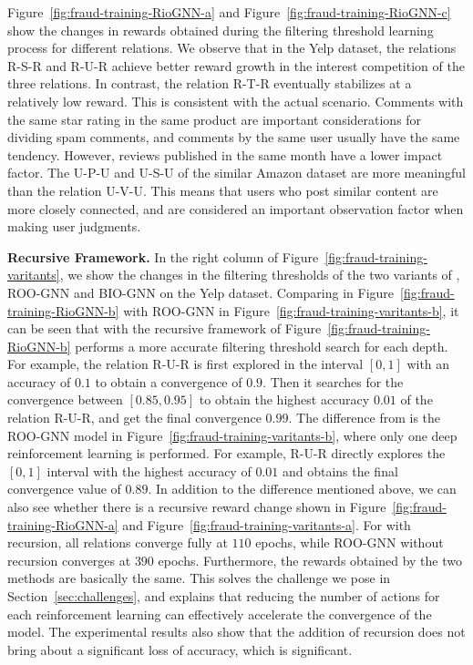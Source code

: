 Figure~\ref{fig:fraud-training-RioGNN-a} and Figure~\ref{fig:fraud-training-RioGNN-c} show the changes in rewards obtained during the filtering threshold learning process for different relations.
We observe that in the Yelp dataset, the relations R-S-R and R-U-R achieve better reward growth in the interest competition of the three relations. 
In contrast, the relation R-T-R eventually stabilizes at a relatively low reward. 
This is consistent with the actual scenario. 
Comments with the same star rating in the same product are important considerations for dividing spam comments, and comments by the same user usually have the same tendency. 
However, reviews published in the same month have a lower impact factor. 
The U-P-U and U-S-U of the similar Amazon dataset are more meaningful than the relation U-V-U. 
This means that users who post similar content are more closely connected, and are considered an important observation factor when making user judgments.



\textbf{Recursive Framework.}
In the right column of Figure~\ref{fig:fraud-training-varitants}, we show the changes in the filtering thresholds of the two variants of \RSRL, ROO-GNN and BIO-GNN on the Yelp dataset.
Comparing \RioGNN in Figure~\ref{fig:fraud-training-RioGNN-b} with ROO-GNN in Figure~\ref{fig:fraud-training-varitants-b}, it can be seen that \RioGNN with the recursive framework of Figure~\ref{fig:fraud-training-RioGNN-b} performs a more accurate filtering threshold search for each depth.
For example, the relation R-U-R is first explored in the interval $[0,1]$ with an accuracy of $0.1$ to obtain a convergence of $0.9$.
Then it searches for the convergence between $[0.85,0.95]$ to obtain the highest accuracy $0.01$ of the relation R-U-R, and get the final convergence $0.99$. 
The difference from \RioGNN is the ROO-GNN model in Figure~\ref{fig:fraud-training-varitants-b}, where only one deep reinforcement learning is performed.
For example, R-U-R directly explores the $[0,1]$ interval with the highest accuracy of $0.01$ and obtains the final convergence value of $0.89$.
In addition to the difference mentioned above, we can also see whether there is a recursive reward change shown in Figure~\ref{fig:fraud-training-RioGNN-a} and Figure~\ref{fig:fraud-training-varitants-a}.
For \RioGNN with recursion, all relations converge fully at $110$ epochs, while ROO-GNN without recursion converges at $390$ epochs.
Furthermore, the rewards obtained by the two methods are basically the same.
This solves the challenge we pose in Section~\ref{sec:challenges}, and explains that reducing the number of actions for each reinforcement learning can effectively accelerate the convergence of the model.
The experimental results also show that the addition of recursion does not bring about a significant loss of accuracy, which is significant.

